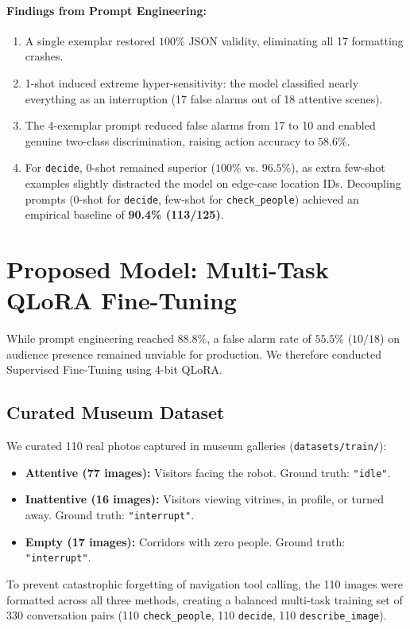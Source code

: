 ﻿\documentclass[11pt,a4paper]{article}
\begin{document}
\paragraph{Findings from Prompt Engineering:}
\begin{enumerate}
    \item A single exemplar restored $100\%$ JSON validity, eliminating all 17 formatting crashes.
    \item 1-shot induced extreme hyper-sensitivity: the model classified nearly everything as an interruption (17 false alarms out of 18 attentive scenes).
    \item The 4-exemplar prompt reduced false alarms from 17 to 10 and enabled genuine two-class discrimination, raising action accuracy to $58.6\%$.
    \item For \texttt{decide}, 0-shot remained superior ($100\%$ vs. $96.5\%$), as extra few-shot examples slightly distracted the model on edge-case location IDs. Decoupling prompts (0-shot for \texttt{decide}, few-shot for \texttt{check\_people}) achieved an empirical baseline of \textbf{90.4\% (113/125)}.
\end{enumerate}

\section{Proposed Model: Multi-Task QLoRA Fine-Tuning}

While prompt engineering reached $88.8\%$, a false alarm rate of $55.5\%$ ($10/18$) on audience presence remained unviable for production. We therefore conducted Supervised Fine-Tuning using 4-bit QLoRA.

\subsection{Curated Museum Dataset}
We curated 110 real photos captured in museum galleries (\texttt{datasets/train/}):
\begin{itemize}
    \item \textbf{Attentive (77 images):} Visitors facing the robot. Ground truth: \texttt{"idle"}.
    \item \textbf{Inattentive (16 images):} Visitors viewing vitrines, in profile, or turned away. Ground truth: \texttt{"interrupt"}.
    \item \textbf{Empty (17 images):} Corridors with zero people. Ground truth: \texttt{"interrupt"}.
\end{itemize}
To prevent catastrophic forgetting of navigation tool calling, the 110 images were formatted across all three methods, creating a balanced multi-task training set of 330 conversation pairs (110 \texttt{check\_people}, 110 \texttt{decide}, 110 \texttt{describe\_image}).
\end{document}

